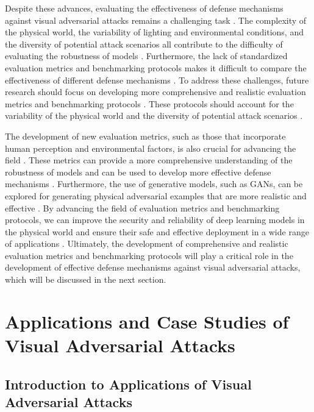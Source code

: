 \documentclass[11pt,a4paper]{article}
\begin{document}
Despite these advances, evaluating the effectiveness of defense mechanisms against visual adversarial attacks remains a challenging task \cite{arxiv:1810.00069}. The complexity of the physical world, the variability of lighting and environmental conditions, and the diversity of potential attack scenarios all contribute to the difficulty of evaluating the robustness of models \cite{doi:10.1109/lcomm.2019.2901469}. Furthermore, the lack of standardized evaluation metrics and benchmarking protocols makes it difficult to compare the effectiveness of different defense mechanisms \cite{doi:10.1007/s11633-019-1211-x}. To address these challenges, future research should focus on developing more comprehensive and realistic evaluation metrics and benchmarking protocols \cite{doi:10.1155/2021/4907754}. These protocols should account for the variability of the physical world and the diversity of potential attack scenarios \cite{doi:10.1145/3433210.3437513}.

The development of new evaluation metrics, such as those that incorporate human perception and environmental factors, is also crucial for advancing the field \cite{doi:10.1007/s13042-021-01435-0}. These metrics can provide a more comprehensive understanding of the robustness of models and can be used to develop more effective defense mechanisms \cite{doi:10.1109/wacvw54805.2022.00036}. Furthermore, the use of generative models, such as GANs, can be explored for generating physical adversarial examples that are more realistic and effective \cite{arxiv:2209.09502}. By advancing the field of evaluation metrics and benchmarking protocols, we can improve the security and reliability of deep learning models in the physical world and ensure their safe and effective deployment in a wide range of applications \cite{doi:10.32604/jai.2021.014175}. Ultimately, the development of comprehensive and realistic evaluation metrics and benchmarking protocols will play a critical role in the development of effective defense mechanisms against visual adversarial attacks, which will be discussed in the next section.


\section{Applications and Case Studies of Visual Adversarial Attacks}



\subsection{Introduction to Applications of Visual Adversarial Attacks}
\end{document}
